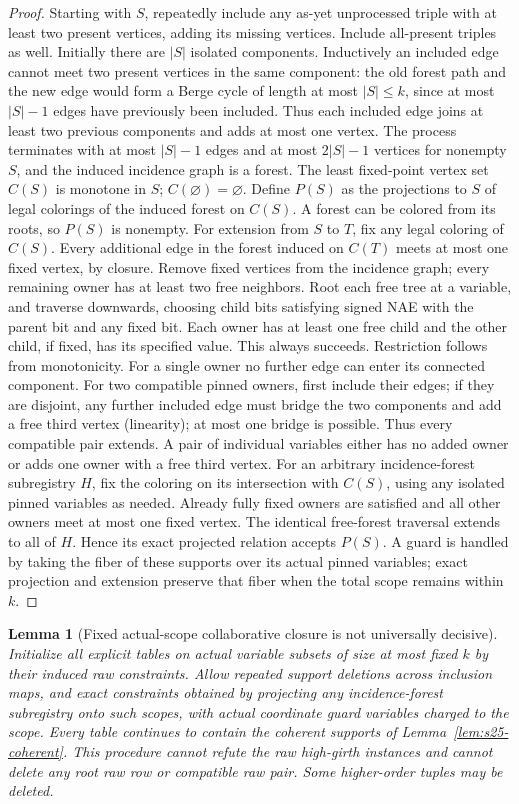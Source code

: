 \documentclass[11pt]{article}
\newtheorem{lemma}[theorem]{Lemma}
\begin{document}
\begin{proof}
Starting with $S$, repeatedly include any as-yet unprocessed triple with at least two present vertices, adding its missing vertices. Include all-present triples as well. Initially there are $|S|$ isolated components. Inductively an included edge cannot meet two present vertices in the same component: the old forest path and the new edge would form a Berge cycle of length at most $|S|\le k$, since at most $|S|-1$ edges have previously been included. Thus each included edge joins at least two previous components and adds at most one vertex. The process terminates with at most $|S|-1$ edges and at most $2|S|-1$ vertices for nonempty $S$, and the induced incidence graph is a forest. The least fixed-point vertex set $C(S)$ is monotone in $S$; $C(\varnothing)=\varnothing$. Define $P(S)$ as the projections to $S$ of legal colorings of the induced forest on $C(S)$. A forest can be colored from its roots, so $P(S)$ is nonempty.
For extension from $S$ to $T$, fix any legal coloring of $C(S)$. Every additional edge in the forest induced on $C(T)$ meets at most one fixed vertex, by closure. Remove fixed vertices from the incidence graph; every remaining owner has at least two free neighbors. Root each free tree at a variable, and traverse downwards, choosing child bits satisfying signed NAE with the parent bit and any fixed bit. Each owner has at least one free child and the other child, if fixed, has its specified value. This always succeeds. Restriction follows from monotonicity. For a single owner no further edge can enter its connected component. For two compatible pinned owners, first include their edges; if they are disjoint, any further included edge must bridge the two components and add a free third vertex (linearity); at most one bridge is possible. Thus every compatible pair extends. A pair of individual variables either has no added owner or adds one owner with a free third vertex.
For an arbitrary incidence-forest subregistry $H$, fix the coloring on its intersection with $C(S)$, using any isolated pinned variables as needed. Already fully fixed owners are satisfied and all other owners meet at most one fixed vertex. The identical free-forest traversal extends to all of $H$. Hence its exact projected relation accepts $P(S)$. A guard is handled by taking the fiber of these supports over its actual pinned variables; exact projection and extension preserve that fiber when the total scope remains within $k$.
\end{proof}
\begin{lemma}[Fixed actual-scope collaborative closure is not universally decisive]\label{lem:s25-barrier}
Initialize all explicit tables on actual variable subsets of size at most fixed $k$ by their induced raw constraints. Allow repeated support deletions across inclusion maps, and exact constraints obtained by projecting any incidence-forest subregistry onto such scopes, with actual coordinate guard variables charged to the scope. Every table continues to contain the coherent supports of Lemma~\ref{lem:s25-coherent}. This procedure cannot refute the raw high-girth instances and cannot delete any root raw row or compatible raw pair. Some higher-order tuples may be deleted.
\end{lemma}
\end{document}
